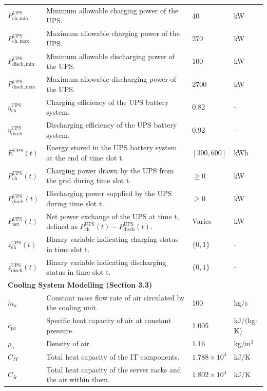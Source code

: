 \documentclass[lettersize,journal]{IEEEtran}
\begin{document}
{{\begin{longtable}{p{} p{} p{} p{}}
$P^{\mathrm{UPS}}_{\mathrm{ch,min}}$ & Minimum allowable charging power of the UPS. & 40 &kW \\
$P^{\mathrm{UPS}}_{\mathrm{ch,max}}$ & Maximum allowable charging power of the UPS. & 270 &kW \\
$P^{\mathrm{UPS}}_{\mathrm{disch,min}}$ & Minimum allowable discharging power of the UPS. & 100 &kW \\
$P^{\mathrm{UPS}}_{\mathrm{disch,max}}$ & Maximum allowable discharging power of the UPS. & 2700 &kW \\
$\eta^{\mathrm{UPS}}_{\mathrm{ch}}$ & Charging efficiency of the UPS battery system. & 0.82 & - \\
$\eta^{\mathrm{UPS}}_{\mathrm{disch}}$ & Discharging efficiency of the UPS battery system. & 0.92 & - \\
$E^{\mathrm{UPS}}(t)$ & Energy stored in the UPS battery system at the end of time slot t. & $[300, 600]$ &kWh \\
$P^{\mathrm{UPS}}_{\mathrm{ch}}(t)$ & Charging power drawn by the UPS from the grid during time slot t. & $\geq 0$ &kW \\
$P^{\mathrm{UPS}}_{\mathrm{disch}}(t)$ & Discharging power supplied by the UPS during time slot t. & $\geq 0$ &kW \\
$P^{\mathrm{UPS}}_{\mathrm{net}}(t)$ & Net power exchange of the UPS at time t, defined as $P^{\mathrm{UPS}}_{\mathrm{ch}}(t) - P^{\mathrm{UPS}}_{\mathrm{disch}}(t)$. & Varies &kW \\
$z^{\mathrm{UPS}}_{\mathrm{ch}}(t)$ & Binary variable indicating charging status in time slot t. & $\{0, 1\}$ & - \\
$z^{\mathrm{UPS}}_{\mathrm{disch}}(t)$ & Binary variable indicating discharging status in time slot t. & $\{0, 1\}$ & - \\
\midrule
\multicolumn{4}{l}{\textbf{Cooling System Modelling (Section 3.3)}} \\
\midrule
$\dot{m}_a$ & Constant mass flow rate of air circulated by the cooling unit. & 100 & kg/s \\
$c_{pa}$ & Specific heat capacity of air at constant pressure. & 1.005 & kJ/(kg$\cdot$K) \\
$\rho_a$ & Density of air. & 1.16 & kg/m$^3$ \\
$C_{IT}$ & Total heat capacity of the IT components. & $1.788 \times 10^4$ & kJ/K \\
$C_R$ & Total heat capacity of the server racks and the air within them. & $1.802 \times 10^4$ & kJ/K \\

\end{longtable}}}
\end{document}
